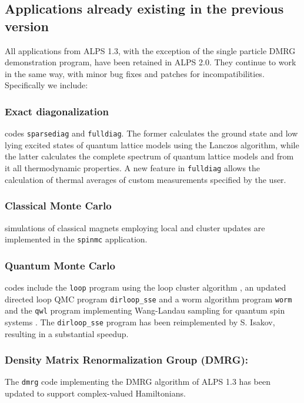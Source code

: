 \documentclass[12pt]{iopart}
\begin{document}
\subsection{Applications already existing in the previous version}
All applications from ALPS 1.3, with the exception of the single particle DMRG demonstration program, have been retained in ALPS 2.0. They continue to work in the same way, with minor bug fixes and patches for incompatibilities. Specifically we include:

\subsubsection{Exact diagonalization}
codes {\tt sparsediag} and {\tt fulldiag}. The former calculates the ground state
and low lying excited states of quantum lattice models using the
Lanczos \cite{lanczos} algorithm, while the latter calculates the complete
spectrum of quantum lattice models and from it all thermodynamic
properties. A new feature in {\tt fulldiag} allows the calculation of thermal averages of custom measurements specified by the user.


\subsubsection{Classical Monte Carlo} 
simulations of classical magnets employing local and cluster
updates \cite{Swendsen87} are implemented in the {\tt spinmc} application.

\subsubsection{Quantum Monte Carlo} codes include the {\tt loop}  program using the loop cluster
algorithm \cite{Evertz03,Todo01,looper}, an updated directed loop QMC \cite{Sylyuasen,Alet2005} program {\tt dirloop\_sse} and a  worm algorithm \cite{Prokofev98A} program  {\tt worm} and the {\tt qwl} program implementing Wang-Landau sampling for quantum spin systems \cite{Troyer03}. The {\tt dirloop\_sse} program has been reimplemented by S. Isakov, resulting in a substantial speedup.

  
\subsubsection{Density Matrix Renormalization Group (DMRG):} The {\tt dmrg} code implementing the DMRG algorithm \cite{White1992,Schollwock2005}  of ALPS 1.3 has been updated to support complex-valued Hamiltonians.
\end{document}
